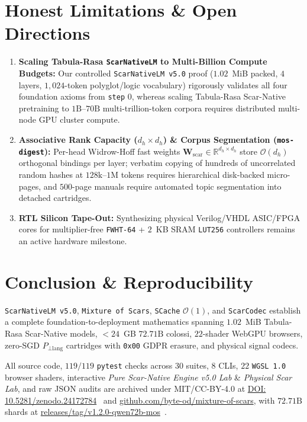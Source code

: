 \documentclass[10pt,twocolumn]{article}
\newif\ifanonymous
\begin{document}
\section{Honest Limitations \& Open Directions}
\begin{enumerate}
    \item \textbf{Scaling Tabula-Rasa \texttt{ScarNativeLM} to Multi-Billion Compute Budgets:} Our controlled \texttt{ScarNativeLM v5.0} proof ($1.02$~MiB packed, $4$ layers, $1{,}024$-token polyglot/logic vocabulary) rigorously validates all four foundation axioms from \texttt{step} $0$, whereas scaling Tabula-Rasa Scar-Native pretraining to $1\text{B}$--$70\text{B}$ multi-trillion-token corpora requires distributed multi-node GPU cluster compute.
    \item \textbf{Associative Rank Capacity ($d_h \times d_h$) \& Corpus Segmentation (\texttt{mos-digest}):} Per-head Widrow-Hoff fast weights $\mathbf{W}_{\text{scar}} \in \mathbb{R}^{d_h \times d_h}$ store $\mathcal{O}(d_h)$ orthogonal bindings per layer; verbatim copying of hundreds of uncorrelated random hashes at $128\text{k}$--$1\text{M}$ tokens requires hierarchical disk-backed micro-pages, and $500$-page manuals require automated topic segmentation into detached cartridges.
    \item \textbf{RTL Silicon Tape-Out:} Synthesizing physical Verilog/VHDL ASIC/FPGA cores for multiplier-free \texttt{FWHT-64} + $2$~KB SRAM \texttt{LUT256} controllers remains an active hardware milestone.
\end{enumerate}

\section{Conclusion \& Reproducibility}
\texttt{ScarNativeLM v5.0}, \texttt{Mixture of Scars}, \texttt{SCache} $\mathcal{O}(1)$, and \texttt{ScarCodec} establish a complete foundation-to-deployment mathematics spanning $1.02$~MiB Tabula-Rasa Scar-Native models, $<24$~GB $72.71\text{B}$ colossi, $22$-shader WebGPU browsers, zero-SGD $P_{\perp\text{lang}}$ cartridges with \texttt{0x00} GDPR erasure, and physical signal codecs.
\ifanonymous
All source code, $119/119$ \texttt{pytest} checks across $30$ suites, $8$ CLIs (\texttt{mos-scar-native}, \texttt{mos-run}, \texttt{mos-store}, \texttt{mos-graft}, \texttt{mos-rebasin}, \texttt{mos-transcode-sub2bit}, \texttt{mos-webgpu}, \texttt{mos-scar-codec}), $22$ \texttt{WGSL} shaders, and JSON audits are included in the supplementary archive.
\else
All source code, $119/119$ \texttt{pytest} checks across $30$ suites, $8$ CLIs, $22$ \texttt{WGSL 1.0} browser shaders, interactive \emph{Pure Scar-Native Engine v5.0 Lab} \& \emph{Physical Scar Lab}, and raw JSON audits are archived under MIT/CC-BY-4.0 at \href{https://doi.org/10.5281/zenodo.24172784}{DOI: 10.5281/zenodo.24172784}~\citep{reisfilho2026mos_zenodo} and \href{https://github.com/byte-od/mixture-of-scars}{github.com/byte-od/mixture-of-scars}, with $72.71\text{B}$ shards at \href{https://github.com/byte-od/mixture-of-scars/releases/tag/v1.2.0-qwen72b-mos}{releases/tag/v1.2.0-qwen72b-mos}~\citep{reisfilho2026qwen72b_mos_v2}.
\fi



\end{document}
